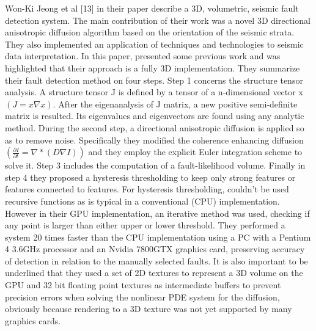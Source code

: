 Won-Ki Jeong et al [13] in their paper describe a 3D, volumetric, seismic fault detection system. The main contribution of their work was a novel 3D directional anisotropic diffusion algorithm based on the orientation of the seismic strata. They also implemented an application of techniques and technologies to seismic data interpretation. In this paper, presented some previous work and was highlighted that their approach is a fully 3D implementation. They summarize their fault detection method on four steps. Step 1 concerns the structure tensor analysis. A structure tensor J is defined by a tensor of a n-dimensional vector x $(J = x \nabla x)$. After the eigenanalysis of J matrix, a new positive semi-definite matrix is resulted. Its eigenvalues and eigenvectors are found using any analytic method. During the second step,  a directional anisotropic diffusion is applied so as to remove noise. Specifically they modified the coherence enhancing diffusion $( \frac{\partial I}{\partial t} = \nabla * (D \nabla I))$ and they employ the explicit Euler integration scheme to solve it. Step 3 includes the computation of a fault-likelihood volume. Finally in step 4 they proposed a hysteresis thresholding to keep only strong features or features connected to features. For hysteresis thresholding, couldn't be used recursive functions as is typical in a conventional (CPU) implementation. However in their GPU implementation, an iterative method was used, checking if any point is larger than either upper or lower threshold. They performed a system 20 times faster than the CPU implementation using a PC with a Pentium 4 3.6GHz processor and an Nvidia 7800GTX graphics card, preserving accuracy of detection in relation to the manually selected faults. It is also important to be underlined that they used a set of 2D textures to represent a 3D volume on the GPU and 32 bit floating point textures as intermediate buffers to prevent precision errors when solving the nonlinear PDE system for the diffusion, obviously because rendering to a 3D texture was not yet supported by many graphics cards.

